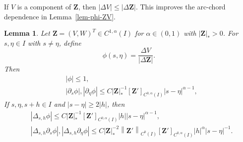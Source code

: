 \documentclass[11pt,reqno]{amsart}
\theoremstyle{plain}
\newtheorem{lemma}[theorem]{Lemma}
\theoremstyle{definition}
\numberwithin{equation}{section}
\newcommand{\p}{\partial}
\newcommand{\bm}[1]{\boldsymbol{#1}}
\newcommand{\abs}[1]{\left\lvert #1 \right\rvert}
\newcommand{\norm}[1]{\left\lVert #1 \right\rVert}
\newcommand{\ci}[1]{C^{#1}(I)}
\begin{document}
If $V$ is a component of $\bm Z$, then
$\abs{\Delta V}\le\abs{\Delta\bm Z}$. This improves the arc-chord dependence
in Lemma~\ref{lem-phi-ZV}.
\begin{lemma}\label{lem-phi-Z}
Let $\bm Z = (V, W)^T\in \ci{1,\alpha}$ for $\alpha\in(0,1)$ with
$\abs{\bm Z}_*>0$. For $s,\eta\in I$ with $s\ne\eta$, define
\begin{equation}
    \phi(s,\eta) = \frac{\Delta V}{\abs{\Delta\bm Z}}.
\end{equation}
Then
\begin{align}
    &\abs{\phi}\le 1,\\
    &\abs{\p_s\phi}, \abs{\p_\eta\phi} \le C \abs{\bm Z}_*^{-1}[\bm Z']_{\ci{0,\alpha}}  \abs{s-\eta}^{\alpha-1},
\end{align}
If $s,\eta,s+h\in I$ and $\abs{s-\eta}\ge2\abs h$, then
\begin{align}
    &\abs{\Delta_{s,h}\phi} \le C \abs{\bm Z}_*^{-1}[\bm Z']_{\ci{0,\alpha}} \abs{h} \abs{s-\eta}^{\alpha-1},\\
    &\abs{\Delta_{s,h}\p_s\phi}, \abs{\Delta_{s,h}\p_\eta\phi} \le C \abs{\bm Z}_*^{-2}\norm{\bm Z'}_{\ci{0}}[\bm Z']_{\ci{0,\alpha}} \abs{h}^\alpha\abs{s-\eta}^{-1} .
\end{align}
\end{lemma}
\end{document}

